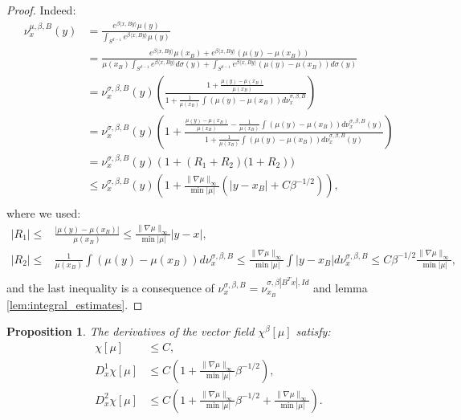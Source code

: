 \documentclass{article}
\numberwithin{theorem}{section}
\newtheorem{proposition}[theorem]{Proposition}
\begin{document}
\begin{proof}
Indeed:
\begin{align*}
\nu_x^{\mu,\beta,B}(y) &= \frac{e^{\beta \langle x, By \rangle} \mu(y)}{\int_{S^{d-1}} e^{\beta \langle x, By \rangle} \mu(y)}\\
&= \frac{ e^{\beta \langle x, By \rangle} \mu(x_B)+e^{\beta \langle x, By \rangle} (\mu(y)-\mu(x_B))}{\mu(x_B)\int_{S^{d-1}} e^{\beta \langle x, B y \rangle} d\sigma(y)+\int_{S^{d-1}} e^{\beta \langle x, B y \rangle} (\mu(y)-\mu(x_B))d\sigma(y)} \\
&= \nu_x^{\sigma,\beta,B}(y)\left(\frac{1+\frac{\mu(y)-\mu(x_B)}{\mu(x_B)}}{1+\frac{1}{\mu(x_B)}\int(\mu(y)-\mu(x_B))d\nu_x^{\sigma,\beta,B}}\right)\\
&=\nu_x^{\sigma, \beta, B}(y)\left(1+\frac{\frac{\mu(y)-\mu(x_B)}{\mu(x_B)}-\frac{1}{\mu(x_B)}\int(\mu(y)-\mu(x_B))d\nu_x^{\sigma,\beta,B}(y)}{1+\frac{1}{\mu(x_B)}\int(\mu(y)-\mu(x_B))d\nu_x^{\sigma,\beta,B}(y)}\right)\\
&=\nu_x^{\sigma, \beta, B}(y)\left(1+(R_1+R_2)(1+R_2\right))\\
&\leq \nu_x^{\sigma, \beta, B}(y)\left(1+\frac{\|\nabla \mu\|_\infty}{\min |\mu|}(|y-x_B|+C\beta^{-1/2})\right),\\
\end{align*}
where we used:
\begin{align*}
|R_1|\leq & \frac{|\mu(y)-\mu(x_B)|}{\mu(x_B)}\leq \frac{\|\nabla \mu\|_\infty}{\min |\mu|}|y-x|,\\
|R_2|\leq & \frac{1}{\mu(x_B)}\int(\mu(y)-\mu(x_B))d\nu_x^{\sigma,\beta, B}\leq \frac{\|\nabla \mu\|_\infty}{\min |\mu|}\int|y-x_B|d\nu_x^{\sigma,\beta,B}\leq C\beta^{-1/2}\frac{\|\nabla \mu\|_\infty}{\min |\mu|},\\
\end{align*}
and the last inequality is a consequence of $\nu_x^{\sigma,\beta, B}=\nu_{x_B}^{\sigma, \beta|B^Tx|, Id}$ and lemma \ref{lem:integral_estimates}.
\end{proof}

\begin{proposition}
\label{prop:chi_bounds}
The derivatives of the vector field $\chi^\beta[\mu]$ satisfy:
\begin{align*}
\chi[\mu]&\leq C,\\
D^1_x\chi[\mu]&\leq C\left(1+\frac{\|\nabla \mu\|_\infty}{\min |\mu|}\beta^{-1/2}\right),\\
D^2_x\chi[\mu]&\leq C\left(1+\frac{\|\nabla \mu\|_\infty}{\min |\mu|}\beta^{-1/2}+\frac{\|\nabla \mu\|_\infty}{\min |\mu|}\right).
\end{align*}
\end{proposition}
\end{document}
